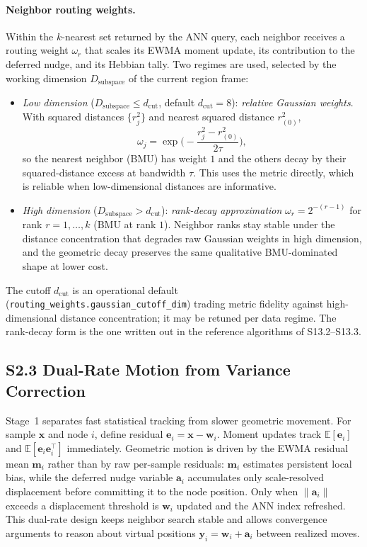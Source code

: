 \documentclass[11pt]{article}
\begin{document}
\paragraph{Neighbor routing weights.}
Within the $k$-nearest set returned by the ANN query, each neighbor receives a routing weight $\omega_r$ that scales its EWMA moment update, its contribution to the deferred nudge, and its Hebbian tally. Two regimes are used, selected by the working dimension $D_{\mathrm{subspace}}$ of the current region frame:
\begin{itemize}[leftmargin=1.5em]
  \item \emph{Low dimension} ($D_{\mathrm{subspace}}\le d_{\mathrm{cut}}$, default $d_{\mathrm{cut}}=8$): \emph{relative Gaussian weights}. With squared distances $\{r_j^2\}$ and nearest squared distance $r_{(0)}^2$,
  \[
  \omega_j=\exp\!\Big(-\frac{r_j^2-r_{(0)}^2}{2\tau}\Big),
  \]
  so the nearest neighbor (BMU) has weight $1$ and the others decay by their squared-distance excess at bandwidth $\tau$. This uses the metric directly, which is reliable when low-dimensional distances are informative.
  \item \emph{High dimension} ($D_{\mathrm{subspace}}>d_{\mathrm{cut}}$): \emph{rank-decay approximation} $\omega_r=2^{-(r-1)}$ for rank $r=1,\dots,k$ (BMU at rank $1$). Neighbor ranks stay stable under the distance concentration that degrades raw Gaussian weights in high dimension, and the geometric decay preserves the same qualitative BMU-dominated shape at lower cost.
\end{itemize}
The cutoff $d_{\mathrm{cut}}$ is an operational default (\texttt{routing\_weights.gaussian\_cutoff\_dim}) trading metric fidelity against high-dimensional distance concentration; it may be retuned per data regime. The rank-decay form is the one written out in the reference algorithms of S13.2--S13.3.

\subsection*{S2.3 Dual-Rate Motion from Variance Correction}
\label{sec:si-dual-rate-motion}
Stage~1 separates fast statistical tracking from slower geometric movement. For sample $\mathbf x$ and node $i$, define residual $\mathbf e_i=\mathbf x-\mathbf w_i$. Moment updates track $\mathbb E[\mathbf e_i]$ and $\mathbb E[\mathbf e_i\mathbf e_i^\top]$ immediately. Geometric motion is driven by the EWMA residual mean $\mathbf m_i$ rather than by raw per-sample residuals: $\mathbf m_i$ estimates persistent local bias, while the deferred nudge variable $\mathbf a_i$ accumulates only scale-resolved displacement before committing it to the node position. Only when $\|\mathbf a_i\|$ exceeds a displacement threshold is $\mathbf w_i$ updated and the ANN index refreshed. This dual-rate design keeps neighbor search stable and allows convergence arguments to reason about virtual positions $\mathbf y_i=\mathbf w_i+\mathbf a_i$ between realized moves.
\end{document}
